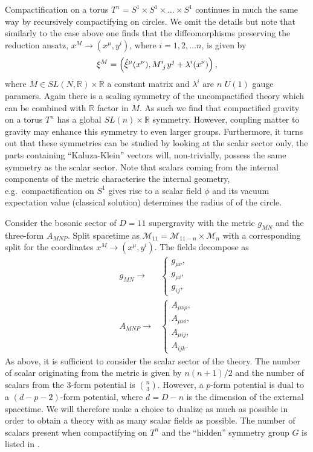 Compactification on a torus $T^n=S^1\times S^1\times\ldots\times S^1$ continues in much the same way by recursively compactifying on circles. We omit the details but note that similarly to the case above one finds that the diffeomorphisms preserving the reduction ansatz, $x^M\to (x^\mu,y^i)$, where $i=1,2,\ldots n$, is given by 
\begin{equation}
    \xi^M = \left(\hat{\xi}^\mu(x^\nu),\tensor{M}{^i_j}y^j+\lambda^i(x^\nu)\right),
\end{equation}
where $M\in SL(N,\mathbb{R})\times \mathbb{R}$ a constant matrix and $\lambda^i$ are $n$ $U(1)$ gauge paramers. Again there is a scaling symmetry of the uncompactified theory which can be combined with $\mathbb{R}$ factor in $M$. As such we find that compactified gravity on a torus $T^n$ has a global $SL(n)\times\mathbb{R}$ symmetry. However, coupling matter to gravity may enhance this symmetry to even larger groups. Furthermore, it turns out that these symmetries can be studied by looking at the scalar sector only, the parts containing ``Kaluza-Klein'' vectors will, non-trivially, possess the same symmetry as the scalar sector. Note that scalars coming from the internal components of the metric characterise the internal geometry, e.g.\ compactification on $S^1$ gives rise to a scalar field $\phi$ and its vacuum expectation value (classical solution) determines the radius of of the circle.

Consider the bosonic sector of $D=11$ supergravity with the metric $g_{MN}$ and the three-form $A_{MNP}$. Split spacetime as $\mathcal{M}_{11}=\mathcal{M}_{11-n}\times\mathcal{M}_n$ with a corresponding split for the coordinates $x^M\to (x^\mu,y^i)$. The fields decompose as 
\begin{align}
        g_{MN}\to &\begin{cases}g_{\mu\nu},\\g_{\mu i},\\g_{ij},\end{cases}\\
        A_{MNP}\to &\begin{cases}A_{\mu\nu\rho},\\A_{\mu\nu i},\\A_{\mu ij},\\A_{ijk}.\end{cases}
\end{align}
As above, it is sufficient to consider the scalar sector of the theory. The number of scalar originating from the metric is given by $n(n+1)/2$ and the number of scalars from the $3$-form potential is ${n}\choose{3}$. However, a $p$-form potential is dual to a $(d-p-2)$-form potential, where $d=D-n$ is the dimension of the external spacetime. We will therefore make a choice to dualize as much as possible in order to obtain a theory with as many scalar fields as possible. The number of scalars present when compactifying on $T^n$ and the ``hidden'' symmetry group $G$ is listed in .

